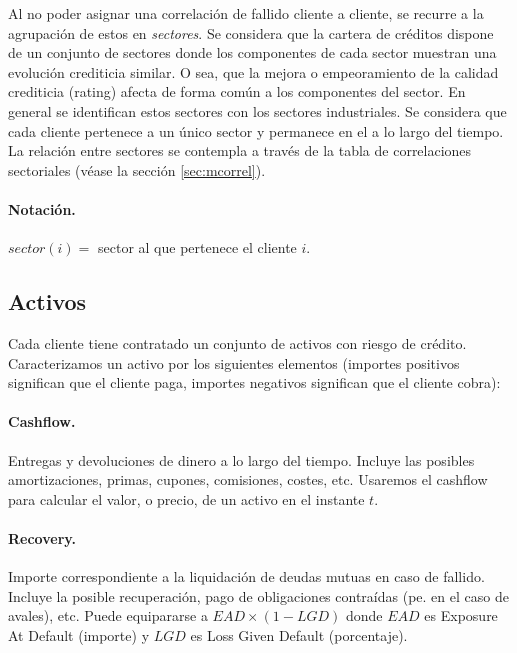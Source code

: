 Al no poder asignar una correlaci\'on de fallido cliente a cliente, se recurre
a la agrupaci\'on de estos en \emph{sectores}. Se considera que
la cartera de cr\'editos dispone de un conjunto de sectores donde los componentes
de cada sector muestran una evoluci\'on crediticia similar. O sea, que la mejora
o empeoramiento de la calidad crediticia (rating) afecta de forma com\'un a los
componentes del sector. En general se identifican estos sectores con los 
sectores industriales. 
\newline
\newline
Se considera que cada cliente pertenece a un \'unico sector y permanece en 
el a lo largo del tiempo. La relaci\'on entre sectores se contempla a trav\'es 
de la tabla de correlaciones sectoriales (v\'ease la secci\'on \ref{sec:mcorrel}).

\paragraph{Notaci\'on.} $sector(i) =$ sector al que pertenece el cliente $i$.

\subsection{Activos}

Cada cliente tiene contratado un conjunto de activos con riesgo de cr\'edito.
Caracterizamos un activo por los siguientes elementos (importes positivos
significan que el cliente paga, importes negativos significan que el cliente 
cobra):

\paragraph{Cashflow.}  Entregas y devoluciones de dinero a lo largo
del tiempo. Incluye las posibles amortizaciones, primas, cupones, comisiones, costes,
etc. Usaremos el cashflow para calcular el valor, o precio, de un activo en el
instante $t$.

\paragraph{Recovery.}  Importe correspondiente a la
liquidaci\'on de deudas mutuas en caso de fallido. Incluye la posible recuperaci\'on,
pago de obligaciones contra\'idas (pe. en el caso de avales), etc. Puede equipararse
a $EAD \times (1-LGD)$ donde $EAD$ es Exposure At Default  (importe) y
$LGD$ es Loss Given Default  (porcentaje).

